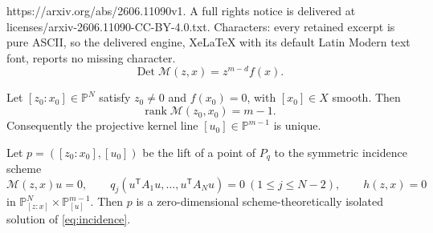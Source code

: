 \documentclass[10pt,a4paper]{amsart}
\DeclareMathOperator{\Det}{Det}
\DeclareMathOperator{\rank}{rank}
\newcommand{\Mcal}{\mathcal M}
\newcommand{\PP}{\mathbb{P}}
\begin{document}
https://arxiv.org/abs/2606.11090v1. A full rights notice is delivered at licenses/arxiv-2606.11090-CC-BY-4.0.txt. Characters: every retained excerpt is pure ASCII, so the delivered engine, XeLaTeX with its default Latin Modern text font, reports no missing character.
\begin{equation}
\label{eq:homdet}
  \Det\Mcal(z,x)=z^{m-d}f(x).
\end{equation}

\begin{lemma}
\label{lem:rank}
Let $[z_0:x_0]\in\PP^N$ satisfy $z_0\ne0$ and $f(x_0)=0$, with
$[x_0]\in X$ smooth.  Then
\[
  \rank\Mcal(z_0,x_0)=m-1.
\]
Consequently the projective kernel line $[u_0]\in\PP^{m-1}$ is unique.
\end{lemma}

\begin{lemma}
\label{lem:isolated}
Let $p=([z_0:x_0],[u_0])$ be the lift of a point of $P_q$ to the symmetric
incidence scheme
\begin{equation}
\label{eq:incidence}
  \Mcal(z,x)u=0,
  \qquad
  q_j(u^{\mathsf T}A_1u,\ldots,u^{\mathsf T}A_Nu)=0\ (1\le j\le N-2),
  \qquad
  h(z,x)=0
\end{equation}
in $\PP^N_{[z:x]}\times\PP^{m-1}_{[u]}$.  Then $p$ is a zero-dimensional
scheme-theoretically isolated solution of \eqref{eq:incidence}.
\end{lemma}
\end{document}
